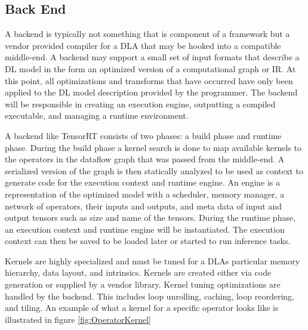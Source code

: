 \subsection{Back End}
A backend is typically not something that is component of a framework
but a vendor provided compiler for a DLA that may be hooked into a compatible
middle-end. A backend may support a small set of input formats that describe
a DL model in the form an optimized version of a computational graph or IR.
At this point, all optimizations and transforms that have occurred have
only been applied to the DL model description provided by the programmer.
The backend will be responsible in creating
an execution engine, outputting a compiled executable, and managing
a runtime environment.

A backend like TensorRT \cite{tensorRT} consists of two phases: a build phase
and runtime phase. During the build phase a kernel search is done to map
available kernels to the operators in the dataflow graph that was passed from
the middle-end. A serialized version of the graph is then statically analyzed to
be used as context to generate code for the execution context and runtime
engine.  An engine is a representation of the optimized model with a scheduler,
memory manager, a network of operators, their inputs and outputs, and meta data
of input and output tensors such as size and name of the tensors.  During the
runtime phase, an execution context and runtime engine will be instantiated.
The execution context can then be saved to be loaded later or started to run
inference tasks.

Kernels are highly specialized and must be tuned for a DLAs particular memory
hierarchy, data layout, and intrinsics. Kernels are created either via code
generation or supplied by a vendor library. Kernel tuning optimizations are
handled by the backend.  This includes loop unrolling, caching, loop
reordering, and tiling. An example of what a kernel for a specific operator
looks like is illustrated in figure \ref{fig:OperatorKernel}

